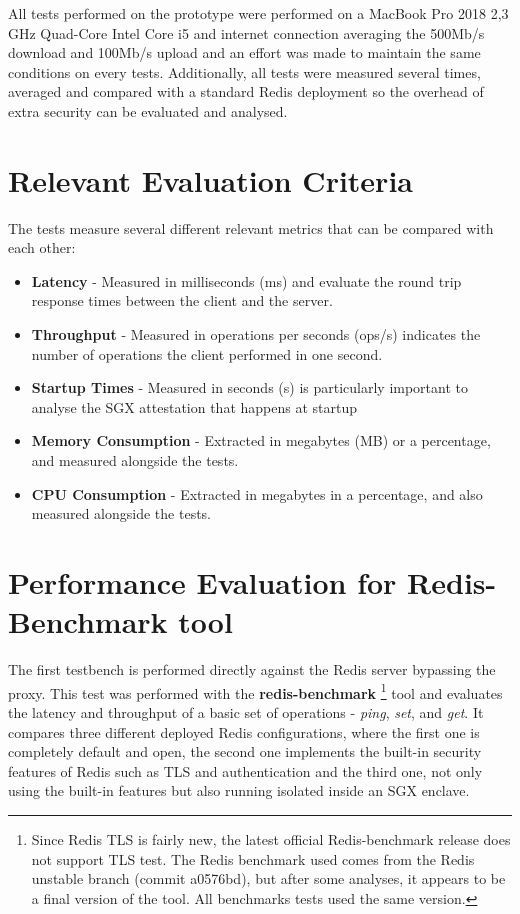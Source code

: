 All tests performed on the prototype were performed on a MacBook Pro 2018 2,3 GHz Quad-Core Intel Core i5 and internet connection averaging the 500Mb/s download and 100Mb/s upload and an effort was made to maintain the same conditions on every tests. Additionally, all tests were measured several times, averaged and compared with a standard Redis deployment so the overhead of extra security can be evaluated and analysed. 

\section{Relevant Evaluation Criteria}
\label{sec:revelant_evaluation_criteria}

The tests measure several different relevant metrics that can be compared with each other: 

\begin{itemize}
  \item \textbf{Latency} - Measured in milliseconds (ms) and evaluate the round trip response times between the client and the server.
  \item \textbf{Throughput} - Measured in operations per seconds (ops/s) indicates the number of operations the client performed in one second.
  \item \textbf{Startup Times} - Measured in seconds (s) is particularly important to analyse the \gls{SGX} attestation that happens at startup
  \item \textbf{Memory Consumption} - Extracted in megabytes (MB) or a percentage, and measured alongside the tests.
  \item \textbf{\gls{CPU} Consumption} - Extracted in megabytes in a percentage, and also measured alongside the tests.
\end{itemize}

\section{Performance Evaluation for Redis-Benchmark tool}
\label{sec:performance_evaluation_redis_benchmark_tool}

The first testbench is performed directly against the Redis server bypassing the proxy. This test was performed with the \textbf{redis-benchmark} \footnote{Since Redis TLS is fairly new, the latest official Redis-benchmark release does not support TLS test. The Redis benchmark used comes from the Redis unstable branch (commit a0576bd), but after some analyses, it appears to be a final version of the tool. All benchmarks tests used the same version.} tool and evaluates the latency and throughput of a basic set of operations - \textit{ping}, \textit{set}, and \textit{get}. It compares three different deployed Redis configurations, where the first one is completely default and open, the second one implements the built-in security features of Redis such as \gls{TLS} and authentication and the third one, not only using the built-in features but also running isolated inside an \gls{SGX} enclave.

